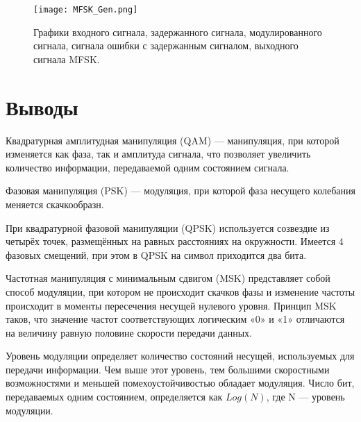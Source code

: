 \begin{figure}[H]
	\begin{center}
		\texttt{[image: MFSK\_Gen.png]}
		\caption{Графики входного сигнала, задержанного сигнала, модулированного сигнала, сигнала ошибки с задержанным сигналом, выходного сигнала MFSK.} %
		\label{MFSK_Gen} %
	\end{center}
\end{figure}
  
 
\section{Выводы}

Квадратурная амплитудная манипуляция (QAM) — манипуляция, при которой изменяется как фаза, так и амплитуда сигнала, что позволяет увеличить количество информации, передаваемой одним состоянием сигнала. 

Фазовая манипуляция (PSK) — модуляция, при которой фаза несущего колебания меняется скачкообразн. 

При квадратурной фазовой манипуляции (QPSK) используется созвездие из четырёх точек, размещённых на равных расстояниях на окружности. Имеется 4 фазовых смещений, при этом в QPSK на символ приходится два бита. 

Частотная манипуляция с минимальным сдвигом (MSK) представляет собой способ модуляции, при котором не происходит скачков фазы и изменение частоты происходит в моменты пересечения несущей нулевого уровня. Принцип MSK таков, что значение частот соответствующих логическим «0» и «1» отличаются на величину равную половине скорости передачи данных.

Уровень модуляции определяет количество состояний несущей, используемых для передачи информации. Чем выше этот уровень, тем большими скоростными возможностями и меньшей помехоустойчивостью обладает модуляция. Число бит, передаваемых одним состоянием, определяется как $Log (N)$, где N — уровень модуляции.
